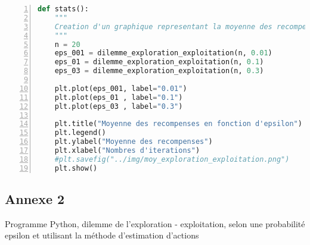 \documentclass[
12pt,
french,
]{article}
\begin{document}
\begin{lstlisting}[language=Python, numbers=left, label=dilemme_exploration_exploitation]
def stats():
    """
    Creation d'un graphique representant la moyenne des recompenses pour 3 probabilites epsilon
    """
    n = 20
    eps_001 = dilemme_exploration_exploitation(n, 0.01)
    eps_01 = dilemme_exploration_exploitation(n, 0.1)
    eps_03 = dilemme_exploration_exploitation(n, 0.3)

    plt.plot(eps_001, label="0.01")
    plt.plot(eps_01 , label="0.1")
    plt.plot(eps_03 , label="0.3")

    plt.title("Moyenne des recompenses en fonction d'epsilon")
    plt.legend()
    plt.ylabel("Moyenne des recompenses")
    plt.xlabel("Nombres d'iterations")
    #plt.savefig("../img/moy_exploration_exploitation.png")
    plt.show()
\end{lstlisting}

\hypertarget{annexe-2}{%
\subsection{Annexe 2}\label{annexe-2}}

Programme Python, dilemme de l'exploration - exploitation, selon une
probabilité epsilon et utilisant la méthode d'estimation d'actions
\end{document}
